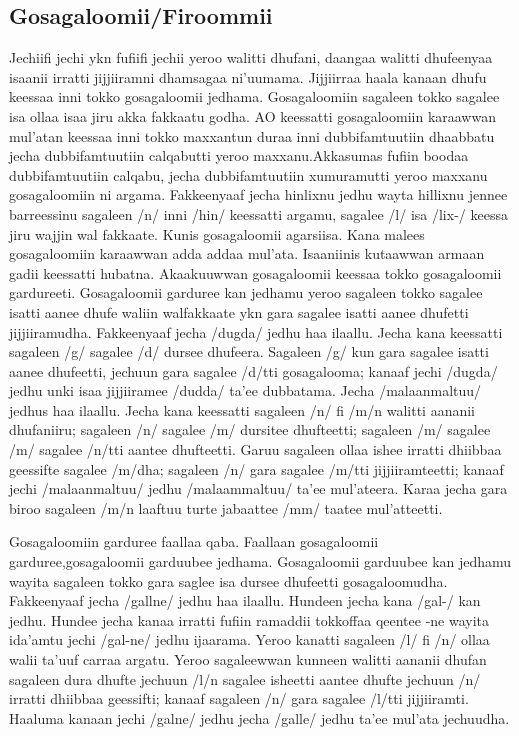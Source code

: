 \documentclass[11pt,b5paper]{book}
\begin{document}
\begin{itemize}
\subsection{Gosagaloomii/Firoommii} 
\setlength{\parindent}{3em}

Jechiifi jechi ykn fufiifi jechii yeroo walitti dhufani, daangaa  walitti dhufeenyaa isaanii irratti jijjiiramni dhamsagaa  ni’uumama. Jijjiirraa haala kanaan dhufu keessaa inni tokko  gosagaloomii jedhama. Gosagaloomiin sagaleen tokko sagalee  isa ollaa isaa jiru akka fakkaatu godha. AO keessatti  gosagaloomiin karaawwan mul’atan keessaa inni tokko  maxxantun duraa inni dubbifamtuutiin dhaabbatu jecha  dubbifamtuutiin calqabutti yeroo maxxanu.Akkasumas fufiin  boodaa dubbifamtuutiin calqabu, jecha dubbifamtuutiin  xumuramutti yeroo maxxanu gosagaloomiin ni  argama. Fakkeenyaaf jecha hinlixnu jedhu wayta hillixnu  jennee barreessinu sagaleen /n/ inni /hin/ keessatti argamu,  sagalee /l/ isa /lix-/ keessa jiru wajjin wal fakkaate. Kunis  gosagaloomii agarsiisa. Kana malees gosagaloomiin karaawwan  adda addaa mul'ata. Isaaniinis kutaawwan armaan gadii  keessatti hubatna. Akaakuuwwan gosagaloomii keessaa tokko gosagaloomii  gardureeti. Gosagaloomii garduree kan jedhamu yeroo sagaleen  tokko sagalee isatti aanee dhufe waliin walfakkaate ykn gara sagalee isatti aanee dhufetti jijjiiramudha. Fakkeenyaaf jecha /dugda/ jedhu haa ilaallu. Jecha kana keessatti sagaleen /g/ sagalee /d/ dursee dhufeera. Sagaleen /g/ kun gara sagalee isatti aanee dhufeetti, jechuun gara sagalee /d/tti gosagalooma; kanaaf jechi /dugda/ jedhu unki isaa jijjiiramee /dudda/ ta'ee dubbatama. Jecha /malaanmaltuu/ jedhus haa ilaallu. Jecha kana keessatti sagaleen /n/ fi /m/n walitti aananii dhufaniiru; sagaleen /n/ sagalee /m/ dursitee dhufteetti; sagaleen /m/ sagalee /m/ sagalee /n/tti aantee dhufteetti. Garuu sagaleen ollaa ishee irratti dhiibbaa geessifte sagalee /m/dha; sagaleen /n/ gara sagalee /m/tti jijjiiramteetti; kanaaf jechi /malaanmaltuu/ jedhu /malaammaltuu/ ta'ee mul'ateera. Karaa jecha gara biroo sagaleen /m/n laaftuu turte jabaattee /mm/ taatee mul'atteetti.

Gosagaloomiin garduree faallaa qaba. Faallaan gosagaloomii garduree,gosagaloomii garduubee jedhama. Gosagaloomii garduubee kan jedhamu wayita  sagaleen tokko gara saglee isa dursee dhufeetti  gosagaloomudha. Fakkeenyaaf jecha /gallne/ jedhu haa ilaallu. Hundeen jecha kana /gal-/ kan jedhu. Hundee jecha kanaa irratti fufiin ramaddii tokkoffaa qeentee {-ne} wayita ida'amtu jechi /gal-ne/ jedhu ijaarama. Yeroo kanatti sagaleen /l/ fi /n/ ollaa walii ta'uuf carraa argatu. Yeroo sagaleewwan kunneen walitti aananii dhufan sagaleen dura dhufte jechuun /l/n sagalee isheetti aantee dhufte jechuun /n/ irratti dhiibbaa geessifti; kanaaf sagaleen /n/ gara sagalee /l/tti jijjiiramti. Haaluma kanaan jechi /galne/ jedhu jecha /galle/ jedhu ta'ee mul'ata jechuudha.


\end{itemize}
\end{document}
